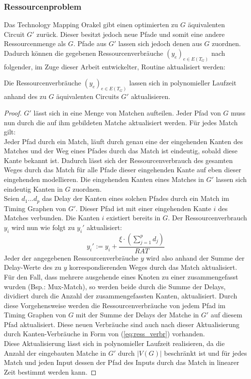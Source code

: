 \documentclass[11pt, a4paper, german]{article}
\newcommand{\TM}{Technology  Mapping }
\begin{document}
\subsubsection{Ressourcenproblem}
Das \TM Orakel  gibt einen optimierten zu $G$ äquivalenten Circuit $G'$ zurück. Dieser besitzt jedoch neue Pfade und somit eine andere Ressourcenmenge als $G$. 
Pfade aus $G'$ lassen sich jedoch denen aus $G$ zuordnen. Dadurch können die gegebenen Ressourcenverbräuche $(y_e)_{e \in E(T_G)}$ nach folgender, im Zuge dieser Arbeit entwickelter, Routine aktualisiert werden:
\begin{lemma}
Die Ressourcenverbräuche $(y_e)_{e \in E(T_G)}$ lassen sich in polynomieller Laufzeit anhand des zu $G$ äquivalenten Circuits $G'$ aktualisieren.
\end{lemma}
\begin{proof}
$G'$ lässt sich in eine Menge von Matchen aufteilen. Jeder Pfad von $G$ muss nun durch die auf ihm gebildeten Matche aktualisiert werden. Für jedes Match gilt: \\
Jeder Pfad durch ein Match, läuft durch genau eine der eingehenden Kanten des Matches  und der Weg eines Pfades durch das Match ist eindeutig, sobald diese Kante bekannt ist. Dadurch lässt sich der Ressourcenverbrauch des gesamten Weges durch das Match für alle Pfade dieser eingehenden Kante auf eben dieser eingehenden  modellieren. Die eingehenden Kanten eines Matches in $G'$ lassen sich eindeutig Kanten in $G$ zuordnen. \\
Seien $d_1 ...d_p$ das Delay der Kanten eines solchen Pfades durch ein Match im Timing Graphen von $G'$.  Dieser Pfad ist mit einer eingehenden Kante $i$ des Matches verbunden. Die Kanten $i$ existiert bereits in $G$. Der Ressourcenverbrauch $y_i$ wird nun wie folgt zu $y_i'$ aktualisiert: 
\[y_i' := y_i + \frac{\xi \cdot(\sum_{j=1}^p d_j)}{RAT}\]
Jeder der angegebenen Ressourcenverbräuche $y$ wird also anhand der Summe der Delay-Werte des zu  $y$ korrespondierenden Weges durch das Match aktualisiert. 
Für den Fall, dass mehrere ausgehende eines Knoten zu einer zusammengefasst wurden (Bsp.: Mux-Match), so werden beide durch die Summe der Delays, dividiert durch die Anzahl der zusammengefassten Kanten, aktualisiert.
Durch diese Vorgehensweise werden die Ressourcenverbräuche von jedem Pfad im Timing Graphen von $G$ mit der Summe der Delays der Matche in $G'$ auf diesem Pfad aktualisiert. Diese neuen Verbräuche sind auch nach dieser Aktualisierung durch Kanten-Verbräuche in Form von (\ref{eq:ress_verbr}) vorhanden. \\
Diese Aktualisierung lässt sich in polynomieller Laufzeit realisieren, da die Anzahl der eingebauten Matche in $G'$ durch $|V(G)|$ beschränkt ist und für jedes Match und jeden Input dessen der Pfad des Inputs durch das Match in linearer Zeit bestimmt werden kann. 
\end{proof}
\end{document}
